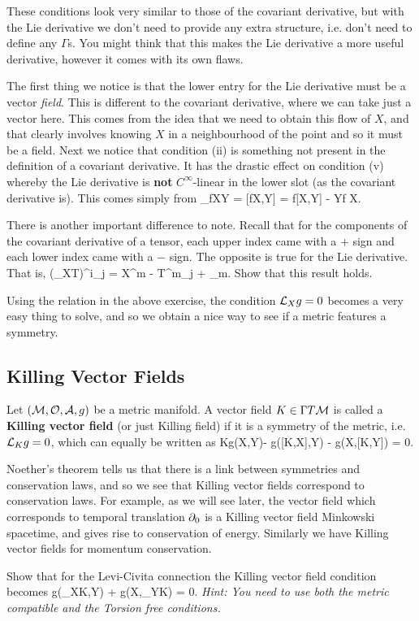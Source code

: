 These conditions look very similar to those of the covariant derivative, but with the Lie derivative we don't need to provide any extra structure, i.e. don't need to define any $\Gamma$s. You might think that this makes the Lie derivative a more useful derivative, however it comes with its own flaws. 

The first thing we notice is that the lower entry for the Lie derivative must be a vector \textit{field}. This is different to the covariant derivative, where we can take just a vector here. This comes from the idea that we need to obtain this flow of $X$, and that clearly involves knowing $X$ in a neighbourhood of the point and so it must be a field. Next we notice that condition (ii) is something not present in the definition of a covariant derivative. It has the drastic effect on condition (v) whereby the Lie derivative is \textbf{not} $C^{\infty}$-linear in the lower slot (as the covariant derivative is). This comes simply from 
\bse 
    \cL_{fX}Y = [fX,Y] = f[X,Y] - Y\la f \ra X.
\ese 

\bbox 
    There is another important difference to note. Recall that for the components of the covariant derivative of a tensor, each upper index came with a $+$ sign and each lower index came with a $-$ sign. The opposite is true for the Lie derivative. That is, 
    \bse 
        {(\cL_XT)^i}_j = X^m  -  {T^m}_j + _m.
    \ese 
    Show that this result holds.
\ebox 

Using the relation in the above exercise, the condition $\mathcal{L}_Xg=0$ becomes a very easy thing to solve, and so we obtain a nice way to see if a metric features a symmetry. 

\subsection{Killing Vector Fields}

    Let $(\mathcal{M},\mathcal{O},\mathcal{A},g)$ be a metric manifold. A vector field $K\in\Gamma T\mathcal{M}$ is called a \textbf{Killing vector field} (or just Killing field) if it is a symmetry of the metric, i.e. $\mathcal{L}_Kg = 0$, which can equally be written as 
    \bse 
        K\big\la g(X,Y)\big\ra - g\big([K,X],Y\big) - g\big(X,[K,Y]\big) = 0.
    \ese 
\ed 

Noether's theorem tells us that there is a link between symmetries and conservation laws, and so we see that Killing vector fields correspond to conservation laws. For example, as we will see later, the vector field which corresponds to temporal translation $\partial_0$ is a Killing vector field Minkowski spacetime, and gives rise to conservation of energy. Similarly we have Killing vector fields for momentum conservation. 

\bbox 
    Show that for the Levi-Civita connection the Killing vector field condition becomes 
    \bse 
        g\big(\nabla_XK,Y\big) + g\big(X,\nabla_YK\big) = 0.
    \ese 
    \textit{Hint: You need to use both the metric compatible and the Torsion free conditions.}
\ebox 